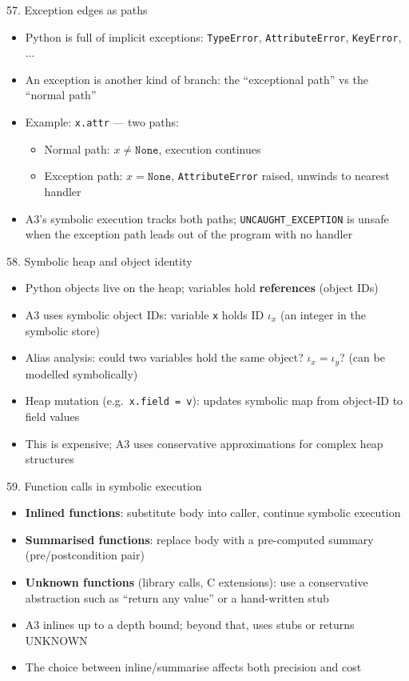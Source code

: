 \documentclass[aspectratio=169]{beamer}
\begin{document}
\begin{frame}{57. Exception edges as paths}
\begin{itemize}
  \item Python is full of implicit exceptions: \texttt{TypeError}, \texttt{AttributeError}, \texttt{KeyError}, ...
  \item An exception is another kind of branch: the ``exceptional path'' vs the ``normal path''
  \item Example: \texttt{x.attr} --- two paths:
    \begin{itemize}
      \item Normal path: \(x \ne \texttt{None}\), execution continues
      \item Exception path: \(x = \texttt{None}\), \texttt{AttributeError} raised, unwinds to nearest handler
    \end{itemize}
  \item A3's symbolic execution tracks both paths; \texttt{UNCAUGHT\_EXCEPTION} is unsafe when the exception path leads out of the program with no handler
\end{itemize}
\end{frame}

\begin{frame}{58. Symbolic heap and object identity}
\begin{itemize}
  \item Python objects live on the heap; variables hold \textbf{references} (object IDs)
  \item A3 uses symbolic object IDs: variable \texttt{x} holds ID \(\iota_x\) (an integer in the symbolic store)
  \item Alias analysis: could two variables hold the same object? \(\iota_x = \iota_y\)? (can be modelled symbolically)
  \item Heap mutation (e.g.\ \texttt{x.field = v}): updates symbolic map from object-ID to field values
  \item This is expensive; A3 uses conservative approximations for complex heap structures
\end{itemize}
\end{frame}

\begin{frame}{59. Function calls in symbolic execution}
\begin{itemize}
  \item \textbf{Inlined functions}: substitute body into caller, continue symbolic execution
  \item \textbf{Summarised functions}: replace body with a pre-computed summary (pre/postcondition pair)
  \item \textbf{Unknown functions} (library calls, C extensions): use a conservative abstraction
    such as ``return any value'' or a hand-written stub
  \item A3 inlines up to a depth bound; beyond that, uses stubs or returns UNKNOWN
  \item The choice between inline/summarise affects both precision and cost
\end{itemize}
\end{frame}
\end{document}
